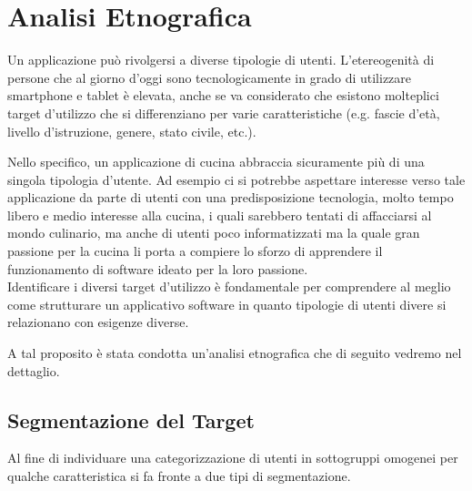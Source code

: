 \section{Analisi Etnografica}
Un applicazione può rivolgersi a diverse tipologie di utenti.
L'etereogenità di persone che al giorno d'oggi sono tecnologicamente in
grado di utilizzare smartphone e tablet è elevata, anche se va
considerato che esistono molteplici target d'utilizzo che si
differenziano per varie caratteristiche (e.g. fascie d'età, livello
d'istruzione, genere, stato civile, etc.).

Nello specifico, un applicazione di cucina abbraccia sicuramente più di
una singola tipologia d'utente. 
Ad esempio ci si potrebbe aspettare interesse verso tale applicazione
da parte di utenti 
con una predisposizione tecnologia, molto tempo
libero e medio interesse alla cucina, i quali sarebbero tentati di
affacciarsi al mondo culinario, ma anche di utenti poco informatizzati ma la
quale gran passione per la cucina li porta a compiere lo sforzo di
apprendere il funzionamento di software ideato per la
loro passione. \\

Identificare i diversi target d'utilizzo è fondamentale per comprendere
al meglio come strutturare un applicativo software in quanto tipologie
di utenti divere si relazionano con esigenze diverse.

A tal proposito è stata condotta un'analisi etnografica che di seguito vedremo nel dettaglio. 

\subsection{Segmentazione del Target}
Al fine di individuare una categorizzazione di utenti in sottogruppi
omogenei per qualche caratteristica si fa fronte a due tipi di
segmentazione.

